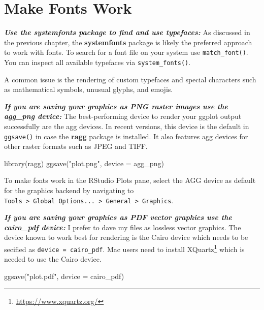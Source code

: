 \documentclass[
]{krantz}
\makeatletter
\newenvironment{Shaded}{\begin{snugshade}}{\end{snugshade}}
\newcommand{\AttributeTok}[1]{\textcolor[rgb]{0.61,0.61,0.61}{#1}}
\newcommand{\FunctionTok}[1]{\textcolor[rgb]{0,0,0}{#1}}
\newcommand{\NormalTok}[1]{#1}
\newcommand{\StringTok}[1]{\textcolor[rgb]{0.5,0.5,0.5}{#1}}
\renewcommand{\href}[2]{#2\footnote{\url{#1}}}
\newenvironment{kframe}{%
\medskip{}
\setlength{\fboxsep}{.8em}
 \def\at@end@of@kframe{}%
 \ifinner\ifhmode%
  \def\at@end@of@kframe{\end{minipage}}%
  \begin{minipage}{\columnwidth}%
 \fi\fi%
 \def\FrameCommand##1{\hskip\@totalleftmargin \hskip-\fboxsep
 \colorbox{shadecolor}{##1}\hskip-\fboxsep
     \hskip-\linewidth \hskip-\@totalleftmargin \hskip\columnwidth}%
 \MakeFramed {\advance\hsize-\width
   \@totalleftmargin\z@ \linewidth\hsize
   \@setminipage}}%
 {\par\unskip\endMakeFramed%
 \at@end@of@kframe}
\renewenvironment{Shaded}{\begin{kframe}}{\end{kframe}}
\makeatother
\begin{document}
\hypertarget{make-fonts-work}{%
\section{Make Fonts Work}\label{make-fonts-work}}

\textbf{\emph{Use the systemfonts package to find and use typefaces:}} As discussed in the previous chapter, the \textbf{systemfonts} package is likely the preferred approach to work with fonts. To search for a font file on your system use \texttt{match\_font()}. You can inspect all available typefaces via \texttt{system\_fonts()}.

A common issue is the rendering of custom typefaces and special characters such as mathematical symbols, unusual glyphs, and emojis.

\textbf{\emph{If you are saving your graphics as PNG raster images use the agg\_png device:}} The best-performing device to render your ggplot output successfully are the agg devices. In recent versions, this device is the default in \texttt{ggsave()} in case the \textbf{ragg} package is installed. It also features agg devices for other raster formats such as JPEG and TIFF.

\begin{Shaded}
\begin{Highlighting}[]
\FunctionTok{library}\NormalTok{(ragg)}
\FunctionTok{ggsave}\NormalTok{(}\StringTok{"plot.png"}\NormalTok{, }\AttributeTok{device =}\NormalTok{ agg\_png)}
\end{Highlighting}
\end{Shaded}

To make fonts work in the RStudio Plots pane, select the AGG device as default for the graphics backend by navigating to \texttt{Tools\ \textgreater{}\ Global\ Options...\ \textgreater{}\ General\ \textgreater{}\ Graphics}.

\textbf{\emph{If you are saving your graphics as PDF vector graphics use the cairo\_pdf device:}} I prefer to dave my files as lossless vector graphics. The device known to work best for rendering is the Cairo device which needs to be secified as \texttt{device\ =\ cairo\_pdf}. Mac users need to install \href{https://www.xquartz.org/}{XQuartz} which is needed to use the Cairo device.

\begin{Shaded}
\begin{Highlighting}[]
\FunctionTok{ggsave}\NormalTok{(}\StringTok{"plot.pdf"}\NormalTok{, }\AttributeTok{device =}\NormalTok{ cairo\_pdf)}
\end{Highlighting}
\end{Shaded}
\end{document}
